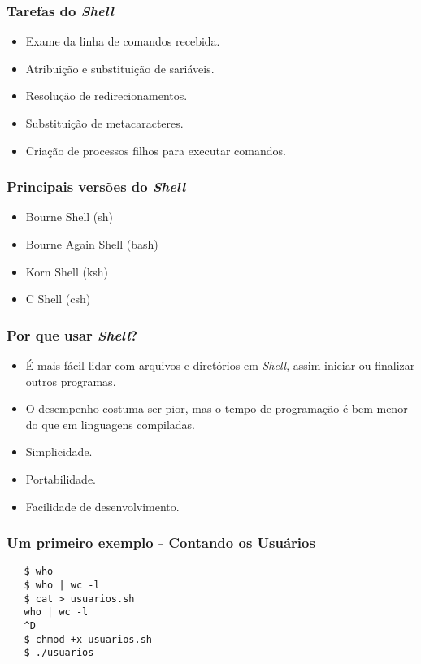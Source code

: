 \documentclass{beamer}
\begin{document}
   \begin{frame}
      \frametitle{Tarefas do \textit{Shell}}
      \begin{itemize}
         \item Exame da linha de comandos recebida.
         \item Atribuição e substituição de sariáveis.
         \item Resolução de redirecionamentos.
         \item Substituição de metacaracteres.
         \item Criação de processos filhos para executar comandos.
      \end{itemize}
   \end{frame}

   \begin{frame}
      \frametitle{Principais versões do \textit{Shell}}
      \begin{itemize}
         \item Bourne Shell (sh)
         \item Bourne Again Shell (bash)
         \item Korn Shell (ksh)
         \item C Shell (csh)
      \end{itemize}
   \end{frame}

\begin{frame}
   \frametitle{Por que usar \textit{Shell}?}
   \begin{itemize}
      \item É mais fácil lidar com arquivos e diretórios em \textit{Shell}, assim iniciar ou finalizar outros programas.
      \item O desempenho costuma ser pior, mas o tempo de programação é bem menor do que em linguagens compiladas.
      \item Simplicidade.
      \item Portabilidade.
      \item Facilidade de desenvolvimento.
   \end{itemize}
\end{frame}


\begin{frame}[fragile]
   \frametitle{Um primeiro exemplo - Contando os Usuários}
   \begin{verbatim}
   $ who
   $ who | wc -l
   $ cat > usuarios.sh
   who | wc -l
   ^D
   $ chmod +x usuarios.sh
   $ ./usuarios
   \end{verbatim}
\end{frame}
\end{document}
